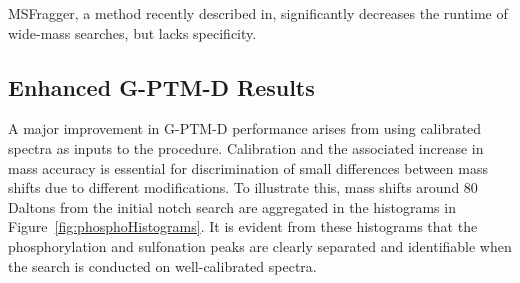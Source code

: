 \documentclass[journal=jprobs,manuscript=article]{achemso}
\begin{document}
MSFragger, a method recently described in\cite{Kong_2017}, significantly decreases the runtime of wide-mass searches, but lacks specificity.

\subsection{Enhanced G-PTM-D Results}

A major improvement in G-PTM-D performance arises from using calibrated spectra as inputs to the procedure. 
Calibration and the associated increase in mass accuracy is essential for discrimination of small differences between mass shifts due to different modifications.
To illustrate this, mass shifts around 80 Daltons from the initial notch search are aggregated in the histograms in Figure~\ref{fig:phosphoHistograms}.
It is evident from these histograms that the phosphorylation and sulfonation peaks are clearly separated and identifiable when the search is conducted on well-calibrated spectra.
\end{document}
